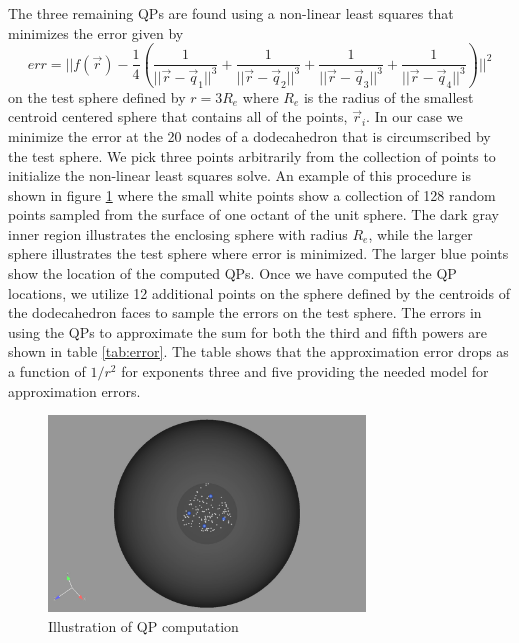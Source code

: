 The three remaining QPs are found using a non-linear least squares that minimizes the error given by
\begin{equation}
err  =  ||f(\vec{r})-\frac{1}{4}\left( \frac{1}{||\vec{r}-\vec{q}_1||^3}
+\frac{1}{||\vec{r}-\vec{q}_2||^3}
+\frac{1}{||\vec{r}-\vec{q}_3||^3}
+\frac{1}{||\vec{r}-\vec{q}_4||^3}\right)||^2
\end{equation}
on the test sphere defined by $r=3R_e$ where $R_e$ is the radius of
the smallest centroid centered sphere that contains all of the points,
$\vec{r}_i$.  In our case we minimize the error at the 20 nodes of a
dodecahedron that is circumscribed by the test sphere.  We pick three
points arbitrarily from the collection of points to initialize the
non-linear least squares solve.  An example of this procedure is shown
in figure \ref{fig:QPs} where the small white points show a collection
of 128 random points sampled from the surface of one octant of the
unit sphere.  The dark gray inner region illustrates the enclosing
sphere with radius $R_e$, while the larger sphere illustrates the test
sphere where error is minimized.  The larger blue points show the
location of the computed QPs.  Once we have computed the QP locations,
we utilize 12 additional points on the sphere defined by the centroids
of the dodecahedron faces to sample the errors on the test sphere.
The errors in using the QPs to approximate the sum for both the third
and fifth powers are shown in table \ref{tab:error}.  The table shows
that the approximation error drops as a function of $1/r^2$ for
exponents three and five providing the needed model for approximation
errors.

\begin{figure}
  \begin{center}
    \noindent
    \includegraphics[width=0.75\textwidth]{Figures/points}
  \end{center}
  \protect\caption{Illustration of QP computation}
  \label{fig:QPs}
\end{figure}

